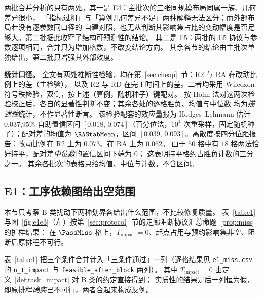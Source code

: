 两批合并分析的只有两处。其一是 E4：主批次的三张同规模布局同属一族、几何差异很小，
「指标过粗」与「算例几何差异不足」两种解释无法区分；而外部布局若没有逐参数同口径的
自建对照，也无从判断其影响集占比的变动幅度是否足够大。第二批据此收窄了结构可预测性的结论。
其二是 E5：两批的 E5 协议与参数逐项相同，合并只为增加格数，不改变结论方向。
其余各节的结论由主批次单独给出，第二批只增强其外部效度。

\textbf{统计口径。}
全文有两处推断性检验，均在第~\ref{sec:cheap}~节：R2 与 RA 在改动比例上的差（主检验），
以及 R2 与 RD 在完工时间上的差。二者均采用 Wilcoxon 符号秩检验，双侧，按上述（算例，随机种子）键配对。
按 Holm 法对这两次检验校正后，各自的显著性判断不变；其余各处的逐格胜负、均值与中位数
均为\emph{描述性}统计，不作显著性断言。
该检验配套的效应量报为 Hodges--Lehmann 估计 \(0.037\),\(95\%\) 自助置信区间
\([0.018,\,0.074]\)（百分位法，\(10^4\) 次重采样，固定随机种子）；配对差的均值为
\(\RAStabMean\)，区间 \([0.039,\,0.093]\)。离散度按四分位距报告：改动比例在 R2 上为
\(0.073\)、在 RA 上为 \(0.062\)。
由于 \(50\) 格中有 \(18\) 格两法恰好持平，配对差\emph{中位数}的置信区间下端为 \(0\)；
这表明持平格约占胜负计数的三分之一。
其余各批次的表格只给均值、中位与计数，不含区间。

\subsection{E1：工序依赖图给出空范围}
\label{sec:e1}

本节只考察 B 类扰动下两种划界各给出什么范围，不比较修复质量。
表~\ref{tab:e1} 与图~\ref{fig:e1e3}（左）按第~\ref{sec:protocol}~节的走廊阻断协议汇总命题~\ref{prop:miss} 的扩样结果：
在 \(\PassMiss\) 格上，\(T_{\mathrm{impact}}=0\)、起点占用与预约影响集非空、阻断后原排程不可行。

表~\ref{tab:e1} 把三个条件合并计入「三条件通过」一列（逐格结果见 \texttt{e1\_miss.csv} 的
\texttt{n\_T\_impact} 与 \texttt{feasible\_after\_block} 两列）。
其中 \(T_{\mathrm{impact}}=0\) 由定义~\ref{def:task_impact} 对 B 类的约定直接得到；
实质性的结果是后一列恒为假，即原排程\emph{确实}已不可行，两者合起来构成反例。

